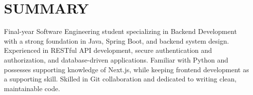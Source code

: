 \section{SUMMARY}
\noindent Final-year Software Engineering student specializing in Backend Development with a strong foundation in Java, Spring Boot, and backend system design. Experienced in RESTful API development, secure authentication and authorization, and database-driven applications. Familiar with Python and possesses supporting knowledge of Next.js, while keeping frontend development as a supporting skill. Skilled in Git collaboration and dedicated to writing clean, maintainable code.
